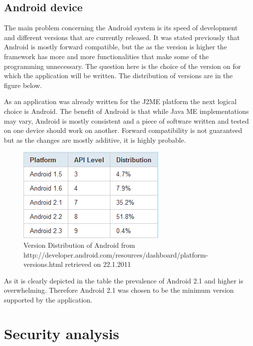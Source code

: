 \documentclass[11pt,twoside,a4paper]{book}
\begin{document}
\subsection{Android device}





The main problem concerning the Android system is its speed of development and different versions that are currently released. It was stated previously that Android is mostly forward compatible, but the as the version is higher the framework has more and more functionalities that make some of the programming unnecessary. The question here is the choice of the version on for which the application will be written. The distribution of versions are in the figure below.

 As an application was already written for the J2ME platform the next logical choice is Android. The benefit of Android\cite{whatisAnd} is that while Java ME implementations may vary, Android is mostly consistent and a piece of software written and tested on one device should work on another. Forward compatibility is not guaranteed but as the changes are mostly additive, it is highly probable. \cite{goodevpi}


\begin{figure}[h]
\begin{center}
\includegraphics[scale=1]{figures/VersionDistribution.PNG} 
\caption{Version Distribution of Android \cite{goodevver} from http://developer.android.com/resources/dashboard/platform-versions.html retrieved on 22.1.2011  }
\label{fig:versions}
\end{center}
\end{figure}


As it is clearly depicted in the table the prevalence of Android 2.1 and higher is overwhelming. Therefore Android 2.1 was chosen to be the minimum version supported by the application.
 	


\section{Security analysis}
\label{sec:security}
\end{document}
